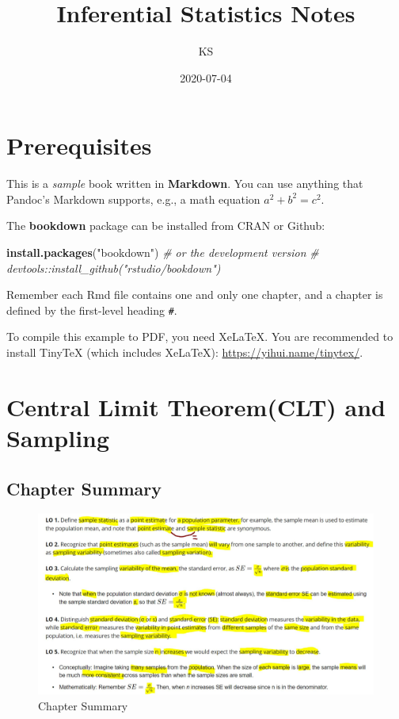 \documentclass[]{book}
\title{Inferential Statistics Notes}
\author{KS}
\date{2020-07-04}
\newenvironment{Shaded}{\begin{snugshade}}{\end{snugshade}}
\newcommand{\KeywordTok}[1]{\textcolor[rgb]{0.13,0.29,0.53}{\textbf{#1}}}
\newcommand{\StringTok}[1]{\textcolor[rgb]{0.31,0.60,0.02}{#1}}
\newcommand{\CommentTok}[1]{\textcolor[rgb]{0.56,0.35,0.01}{\textit{#1}}}
\newcommand{\NormalTok}[1]{#1}
\begin{document}
\maketitle

{
\setcounter{tocdepth}{1}
\tableofcontents
}
\chapter{Prerequisites}\label{prerequisites}

This is a \emph{sample} book written in \textbf{Markdown}. You can use
anything that Pandoc's Markdown supports, e.g., a math equation
\(a^2 + b^2 = c^2\).

The \textbf{bookdown} package can be installed from CRAN or Github:

\begin{Shaded}
\begin{Highlighting}[]
\KeywordTok{install.packages}\NormalTok{(}\StringTok{"bookdown"}\NormalTok{)}
\CommentTok{# or the development version}
\CommentTok{# devtools::install_github("rstudio/bookdown")}
\end{Highlighting}
\end{Shaded}

Remember each Rmd file contains one and only one chapter, and a chapter
is defined by the first-level heading \texttt{\#}.

To compile this example to PDF, you need XeLaTeX. You are recommended to
install TinyTeX (which includes XeLaTeX):
\url{https://yihui.name/tinytex/}.

\chapter{Central Limit Theorem(CLT) and Sampling}\label{clt}

\section{Chapter Summary}\label{chapter-summary}

\begin{figure}

{\centering \includegraphics[width=0.8\linewidth]{graphs/1-1} 

}

\caption{Chapter Summary}\label{fig:chap1-summary-fig}
\end{figure}
\end{document}
